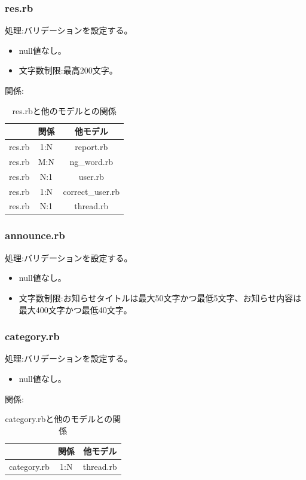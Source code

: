 \documentclass[a4j]{jarticle}
\begin{document}
\subsubsection{res.rb}
\noindent
処理:バリデーションを設定する。
\begin{itemize}
  \item null値なし。
  \item 文字数制限:最高200文字。
\end{itemize}
関係:
\begin{table}[H]
  \centering
  \caption{res.rbと他のモデルとの関係}
  \begin{tabular}{|c|c|c|}\hline
    & 関係 & 他モデル\\ \hline \hline
    res.rb & 1:N & report.rb \\ \hline
    res.rb & M:N & ng\_word.rb \\ \hline
    res.rb & N:1 & user.rb \\ \hline
    res.rb & 1:N & correct\_user.rb \\ \hline
    res.rb & N:1 & thread.rb \\ \hline
  \end{tabular}
\end{table}


\subsubsection{announce.rb}
\noindent
処理:バリデーションを設定する。
\begin{itemize}
  \item null値なし。
  \item 文字数制限:お知らせタイトルは最大50文字かつ最低5文字、お知らせ内容は最大400文字かつ最低40文字。
\end{itemize}

\subsubsection{category.rb}
\noindent
処理:バリデーションを設定する。
\begin{itemize}
  \item null値なし。
\end{itemize}
関係:
\begin{table}[H]
  \centering
  \caption{category.rbと他のモデルとの関係}
  \begin{tabular}{|c|c|c|}\hline
    & 関係 & 他モデル\\ \hline \hline
    category.rb & 1:N & thread.rb \\ \hline
  \end{tabular}
\end{table}
\end{document}
